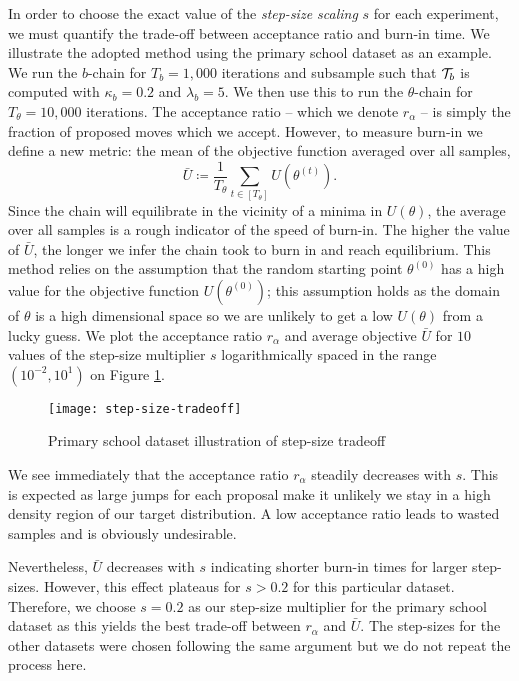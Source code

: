 In order to choose the exact value of the {\em step-size scaling} $s$ for each experiment, we must quantify the trade-off between acceptance ratio and burn-in time. We illustrate the adopted method using the primary school dataset \cite{schools} as an example. We run the $b$-chain for $T_b = 1,000$ iterations and subsample such that $\mathcal{T}_b$ is computed with $\kappa_b=0.2$ and $\lambda_b=5$. We then use this to run the $\theta$-chain for $T_\theta = 10,000$ iterations. The acceptance ratio -- which we denote $r_\alpha$ -- is simply the fraction of proposed moves which we accept. However, to measure burn-in we define a new metric: the mean of the objective function averaged over all samples,
%
\begin{equation}
	\bar{U} \coloneqq \frac{1}{T_\theta} \sum_{t \in [T_\theta]} U\left( \theta^{(t)} \right).
\end{equation}
%
Since the chain will equilibrate in the vicinity of a minima in $U(\theta)$, the average over all samples is a rough indicator of the speed of burn-in. The higher the value of $\bar{U}$, the longer we infer the chain took to burn in and reach equilibrium. This method relies on the assumption that the random starting point $\theta^{(0)}$ has a high value for the objective function $U(\theta^{(0)})$; this assumption holds as the domain of $\theta$ is a high dimensional space so we are unlikely to get a low $U(\theta)$ from a lucky guess. We plot the acceptance ratio $r_\alpha$ and average objective $\bar{U}$ for $10$ values of the step-size multiplier $s$ logarithmically spaced in the range $(10^{-2}, 10^1)$ on Figure \ref{fig:step-size-tradeoff}.
%
\begin{figure}[!h]
	\centering
	\texttt{[image: step-size-tradeoff]}
	\caption{Primary school dataset \cite{schools} illustration of step-size tradeoff}
	\label{fig:step-size-tradeoff}
\end{figure}

We see immediately that the acceptance ratio $r_\alpha$ steadily decreases with $s$. This is expected as large jumps for each proposal make it unlikely we stay in a high density region of our target distribution. A low acceptance ratio leads to wasted samples and is obviously undesirable.

Nevertheless, $\bar{U}$ decreases with $s$ indicating shorter burn-in times for larger step-sizes. However, this effect plateaus for $s>0.2$ for this particular dataset. Therefore, we choose $s=0.2$ as our step-size multiplier for the primary school dataset as this yields the best trade-off between $r_\alpha$ and $\bar{U}$. The step-sizes for the other datasets were chosen following the same argument but we do not repeat the process here.

